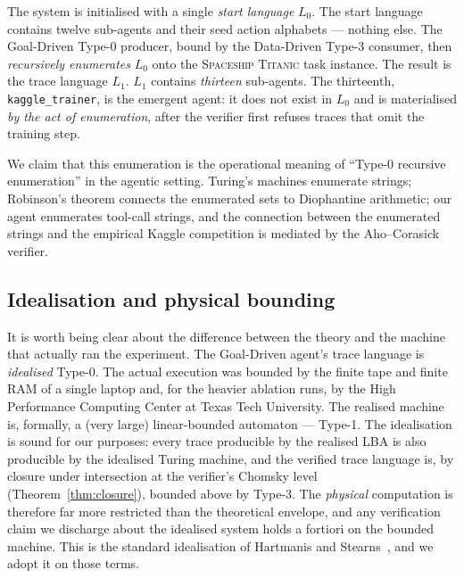 The system is initialised with a single \emph{start language}
$L_0$. %
The start language
contains twelve sub-agents and their seed action alphabets ---
nothing else.  The Goal-Driven Type-0 producer, bound by the
Data-Driven Type-3 consumer, then \emph{recursively enumerates}
$L_0$ onto the \textsc{Spaceship Titanic} task instance.  The
result is the trace language $L_1$. %
$L_1$ contains
\emph{thirteen} sub-agents.  The thirteenth,
\texttt{kaggle\_trainer}, is the emergent agent: it does not
exist in $L_0$ and is materialised \emph{by the act of
enumeration}, after the verifier first refuses traces that omit
the training step.

We claim that this enumeration is the operational meaning of
``Type-0 recursive enumeration'' in the agentic setting.
Turing's machines enumerate strings; Robinson's theorem connects
the enumerated sets to Diophantine arithmetic; our agent
enumerates tool-call strings, and the connection between the
enumerated strings and the empirical Kaggle competition is
mediated by the Aho--Corasick verifier.

\subsection{Idealisation and physical bounding}

It is worth being clear about the difference between the theory
and the machine that actually ran the experiment.  The
Goal-Driven agent's trace language is \emph{idealised} Type-0.
The actual execution was bounded by the finite tape and finite
RAM of a single laptop and, for the heavier ablation runs, by
the High Performance Computing Center at Texas Tech University.
The realised machine is, formally, a (very large) linear-bounded
automaton --- Type-1.  The idealisation is sound for our
purposes: every trace producible by the realised LBA is also
producible by the idealised Turing machine, and the verified
trace language is, by closure under intersection at the
verifier's Chomsky level (Theorem~\ref{thm:closure}), bounded
above by Type-3.  The \emph{physical} computation is therefore
far more restricted than the theoretical envelope, and any
verification claim we discharge about the idealised system holds
a fortiori on the bounded machine.  This is the standard
idealisation of
Hartmanis and Stearns~\cite{hartmanis1965computational}, and we
adopt it on those terms.

